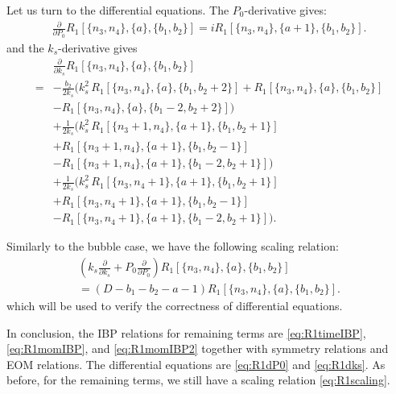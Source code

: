 \documentclass[a4paper]{article}
\begin{document}
Let us turn to the differential equations. The $P_0$-derivative gives:
\begin{align}
	\frac{\partial}{\partial P_0} R_1[\{n_3,n_4\},\{a\},\{b_1,b_2\}] = i R_1[\{n_3,n_4\},\{a+1\},\{b_1,b_2\}]. \label{eq:R1dP0}
\end{align}
and the $k_s$-derivative gives
\begin{align}
	&\frac{\partial}{\partial k_s} R_1[\{n_3,n_4\},\{a\},\{b_1,b_2\}] \nonumber\\
	=&-\frac{b_2}{2k_s}\Big(
	k_s^2\,R_1[\{n_3,n_4\},\{a\},\{b_1,b_2+2\}] 
	+R_1[\{n_3,n_4\},\{a\},\{b_1,b_2\}] \nonumber\\
	&-R_1[\{n_3,n_4\},\{a\},\{b_1-2,b_2+2\}]
	\Big) \nonumber\\
	&+\frac{1}{2k_s}\Big(
	k_s^2\,R_1[\{n_3+1,n_4\},\{a+1\},\{b_1,b_2+1\}] \nonumber\\
	&+R_1[\{n_3+1,n_4\},\{a+1\},\{b_1,b_2-1\}] \nonumber\\
	&-R_1[\{n_3+1,n_4\},\{a+1\},\{b_1-2,b_2+1\}]
	\Big) \nonumber\\
    &+\frac{1}{2k_s}\Big(
	k_s^2\,R_1[\{n_3,n_4+1\},\{a+1\},\{b_1,b_2+1\}] \nonumber\\
    &+R_1[\{n_3,n_4+1\},\{a+1\},\{b_1,b_2-1\}] \nonumber\\
	&-R_1[\{n_3,n_4+1\},\{a+1\},\{b_1-2,b_2+1\}]
	\Big). \label{eq:R1dks}
\end{align}

Similarly to the bubble case, we have the following scaling relation:
\begin{align}
	\left( k_s \frac{\partial}{\partial k_s} + P_0 \frac{\partial}{\partial P_0} \right) R_1[\{n_3,n_4\},\{a\},\{b_1,b_2\}] \nonumber\\
    = (D - b_1 - b_2 - a - 1) R_1[\{n_3,n_4\},\{a\},\{b_1,b_2\}]. \label{eq:R1scaling}
\end{align}
which will be used to verify the correctness of differential equations.

In conclusion, the IBP relations for remaining terms are \eqref{eq:R1timeIBP}, \eqref{eq:R1momIBP}, and \eqref{eq:R1momIBP2} together with symmetry relations and EOM relations. The differential equations are \eqref{eq:R1dP0} and \eqref{eq:R1dks}. As before, for the remaining terms, we still have a scaling relation \eqref{eq:R1scaling}. 
\end{document}

